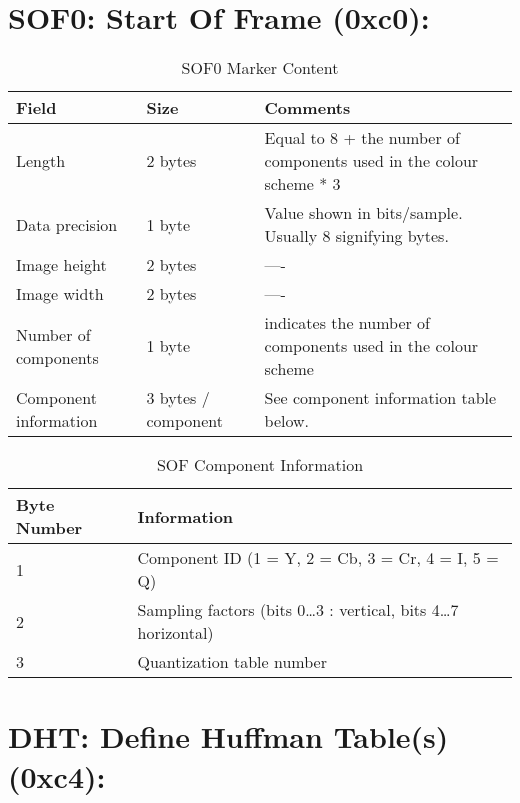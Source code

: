 
\section{SOF0: Start Of Frame (0xc0):}

\begin{table}[!hbtp]
	\label{sof-content}
	\caption{SOF0 Marker Content}
	\centering
	\begin{tabular}{ | p{2cm} | p{1.5cm} | p{4cm} | }
	\hline
	\textbf{Field} & \textbf{Size} & \textbf{Comments} \\ \hline
	Length & 2 bytes & Equal to 8 + the number of components used in the colour scheme * 3\\ \hline
	Data precision & 1 byte & Value shown in bits/sample. Usually 8 signifying bytes.\\ \hline
	Image height  & 2 bytes & ----\\ \hline
	Image width  & 2 bytes & ----\\ \hline
	Number of components & 1 byte & indicates the number of components used  in the colour scheme\\ \hline
	Component information & 3 bytes / component & See component information table below.\\ \hline
	\end{tabular}
\end{table}

\begin{table}[!hbtp]
	\label{sof-comp-content}
	\caption{SOF Component Information}
	\centering
	\begin{tabular}{ | p{2cm} | p{4cm} | }
	\hline
	\textbf{Byte Number} &  \textbf{Information} \\ \hline
	1 & Component ID (1 = Y, 2 = Cb, 3 = Cr, 4 = I, 5 = Q)\\ \hline
	2 & Sampling factors (bits 0\ldots3 : vertical, bits 4\ldots7 horizontal)\\ \hline
	3 & Quantization table number\\ \hline
	\end{tabular}
\end{table}

\newpage

\section{DHT: Define Huffman Table(s) (0xc4):}

